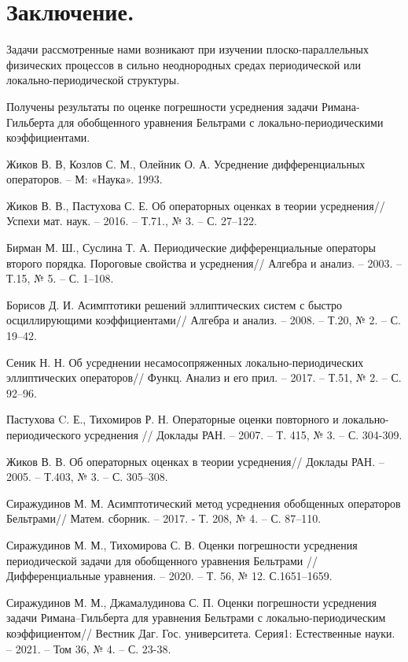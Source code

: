 \documentclass[a4paper,12pt]{article}
\theoremstyle{definition}
\begin{document}
 \section{Заключение.}

 Задачи рассмотренные нами возникают при изучении плоско-парал\-лельных физических процессов в сильно неоднородных
 средах периодической или локально-периодической структуры.

 Получены результаты по оценке погрешности усреднения задачи Римана-Гильберта для обобщенного уравнения Бельтрами
 с локально-периодическими коэффициентами.

\begin{thebibliography}{22}
  Жиков В. В, Козлов С. М., Олейник О. А. Усреднение дифференциальных операторов. – М: «Наука». 1993.

  Жиков В. В., Пастухова С. Е. Об операторных оценках в теории усреднения//Успехи мат. наук. – 2016. – Т.71., № 3. – С. 27–122.

  Бирман М. Ш., Суслина Т. А. Периодические дифференциальные операторы второго порядка. Пороговые свойства  и усреднения// Алгебра  и  анализ. – 2003. – Т.15, № 5. – С. 1–108.

  Борисов Д. И. Асимптотики решений эллиптических систем с быстро осциллирующими коэффициентами// Алгебра и анализ. – 2008. – Т.20, № 2. – С. 19–42.

  Сеник Н. Н. Об усреднении несамосопряженных локально-периодических эллиптических операторов// Функц. Анализ и его прил. – 2017. – Т.51, № 2. – С. 92–96.

  Пастухова C. Е., Тихомиров Р. Н. Операторные оценки повторного  и локально-периодического  усреднения // Доклады РАН. – 2007. – Т. 415, № 3. –  С. 304-309.

  Жиков В. В. Об операторных оценках в теории усреднения// Доклады РАН. – 2005. – Т.403, № 3. – С. 305–308.

  Сиражудинов М. М. Асимптотический метод усреднения обобщенных  операторов Бельтрами// Матем. сборник. – 2017. - Т. 208, № 4. – С. 87–110.

  Сиражудинов М. М., Тихомирова С. В. Оценки погрешности усреднения периодической задачи для обобщенного уравнения Бельтрами // Дифференциальные уравнения. – 2020. – Т. 56, № 12.  С.1651–1659.

  Сиражудинов М. М., Джамалудинова С. П. Оценки погрешности усреднения задачи Римана–Гильберта для уравнения Бельтрами с локально-периодическим коэффициентом//  Вестник Даг. Гос. университета. Серия1: Естественные науки. – 2021. – Том 36, № 4. – С. 23-38.


\end{thebibliography}
\end{document}
